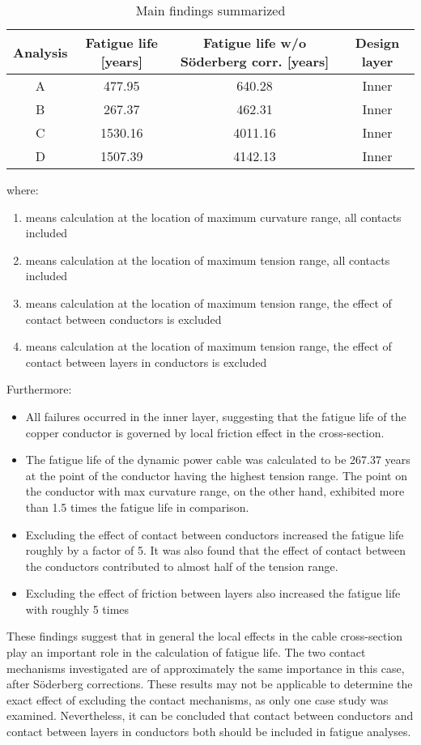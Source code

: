 \begin{table} [H]
\centering
\begin{tabular}{ |c|c|c|c|}
\hline
Analysis & Fatigue life [years] & Fatigue life w/o Söderberg corr. [years] & Design layer \\
 \hline
 \hline
 A & 477.95 & 640.28 & Inner\\
 B & 267.37 &462.31 & Inner\\
 C & 1530.16 & 4011.16 &Inner\\
 D &1507.39  &4142.13 &Inner\\
 \hline
\end{tabular}
\caption{Main findings summarized}
\label{table:mainfind}
\end{table} 
where:
\begin{enumerate}[label=\Alph*]
\item means calculation at the location of maximum curvature range, all contacts included
\item means calculation at the location of maximum tension range, all contacts included
\item means calculation at the location of maximum tension range, the effect of contact between conductors is excluded
\item means calculation at the location of maximum tension range, the effect of contact between layers in conductors is excluded
\end{enumerate}
Furthermore:
\begin{itemize}
\item All failures occurred in the inner layer, suggesting that the fatigue life of the copper conductor is governed by local friction effect in the cross-section.
    \item The fatigue life of the dynamic power cable was calculated to be 267.37 years at the point of the conductor having the highest tension range. The point on the conductor with max curvature range, on the other hand, exhibited more than 1.5 times the fatigue life in comparison.
    \item Excluding the effect of contact between conductors increased the fatigue life roughly by a factor of 5. It was also found that the effect of contact between the conductors contributed to almost half of the tension range. 
    \item Excluding the effect of friction between layers also increased the fatigue life with roughly 5 times
\end{itemize}
These findings suggest that in general the local effects in the cable cross-section play an important role in the calculation of fatigue life. The two contact mechanisms investigated are of approximately the same importance in this case, after Söderberg corrections. These results may not be applicable to determine the exact effect of excluding the contact mechanisms,  as only one case study was examined. Nevertheless, it can be concluded that contact between conductors and contact between layers in conductors both should be included in fatigue analyses.

